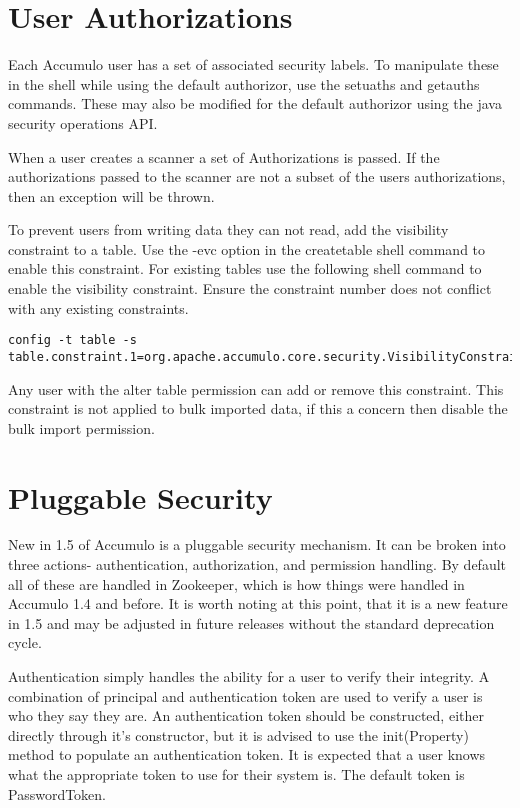 \section{User Authorizations}

Each Accumulo user has a set of associated security labels. To manipulate
these in the shell while using the default authorizor, use the setuaths and getauths commands.
These may also be modified for the default authorizor using the java security operations API. 

When a user creates a scanner a set of Authorizations is passed. If the
authorizations passed to the scanner are not a subset of the users
authorizations, then an exception will be thrown.

To prevent users from writing data they can not read, add the visibility
constraint to a table. Use the -evc option in the createtable shell command to
enable this constraint. For existing tables use the following shell command to
enable the visibility constraint. Ensure the constraint number does not
conflict with any existing constraints.
  
\small
\begin{verbatim}
config -t table -s table.constraint.1=org.apache.accumulo.core.security.VisibilityConstraint
\end{verbatim}
\normalsize

Any user with the alter table permission can add or remove this constraint.
This constraint is not applied to bulk imported data, if this a concern then
disable the bulk import permission.

\section{Pluggable Security}

New in 1.5 of Accumulo is a pluggable security mechanism. It can be broken into three actions-
authentication, authorization, and permission handling. By default all of these are handled in
Zookeeper, which is how things were handled in Accumulo 1.4 and before. It is worth noting at this
point, that it is a new feature in 1.5 and may be adjusted in future releases without the standard
deprecation cycle.

Authentication simply handles the ability for a user to verify their integrity. A combination of 
principal and authentication token are used to verify a user is who they say they are. An 
authentication token should be constructed, either directly through it's constructor, but it is 
advised to use the init(Property) method to populate an authentication token. It is expected that a 
user knows what the appropriate token to use for their system is. The default token is 
PasswordToken. 

